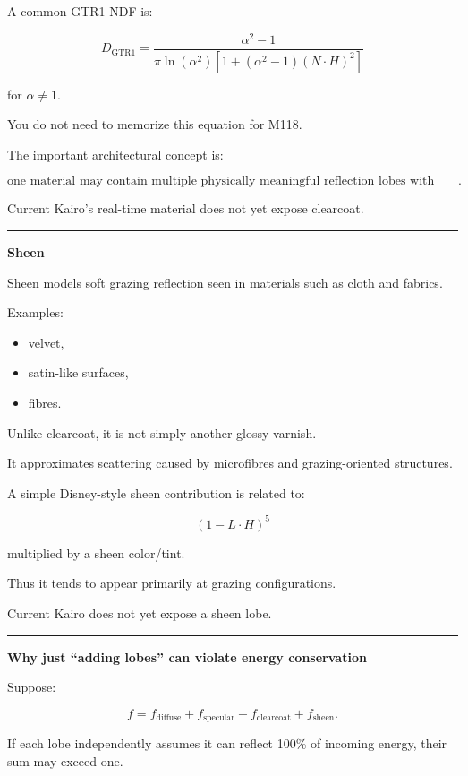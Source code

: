 A common GTR1 NDF is:

\[
D_{\mathrm{GTR1}}
=
\frac{
\alpha^2-1
}{
\pi
\ln(\alpha^2)
\left[
1+(\alpha^2-1)(N\cdot H)^2
\right]
}
\]

for \(\alpha\neq1\).

You do not need to memorize this equation for M118.

The important architectural concept is:

\[
\boxed{
\text{one material may contain multiple physically meaningful reflection lobes with different roughness distributions}.
}
\]

Current Kairo's real-time material does not yet expose clearcoat.

\begin{center}\rule{0.5\linewidth}{0.5pt}\end{center}

\textbf{Sheen}

Sheen models soft grazing reflection seen in materials such as cloth and fabrics.

Examples:

\begin{itemize}
\tightlist
\item
  velvet,
\item
  satin-like surfaces,
\item
  fibres.
\end{itemize}

Unlike clearcoat, it is not simply another glossy varnish.

It approximates scattering caused by microfibres and grazing-oriented structures.

A simple Disney-style sheen contribution is related to:

\[
(1-L\cdot H)^5
\]

multiplied by a sheen color/tint.

Thus it tends to appear primarily at grazing configurations.

Current Kairo does not yet expose a sheen lobe.

\begin{center}\rule{0.5\linewidth}{0.5pt}\end{center}

\textbf{Why just ``adding lobes'' can violate energy conservation}

Suppose:

\[
f=
f_{\text{diffuse}}
+
f_{\text{specular}}
+
f_{\text{clearcoat}}
+
f_{\text{sheen}}.
\]

If each lobe independently assumes it can reflect 100\% of incoming energy, their sum may exceed one.

